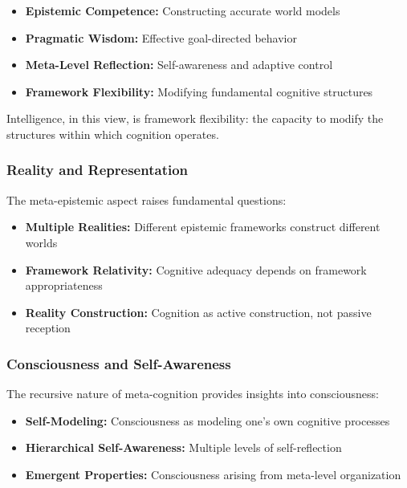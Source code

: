 \documentclass[
]{article}
\providecommand{\tightlist}{%
  \setlength{\itemsep}{0pt}\setlength{\parskip}{0pt}}
\begin{document}
\begin{itemize}
\tightlist
\item
  \textbf{Epistemic Competence:} Constructing accurate world models
\item
  \textbf{Pragmatic Wisdom:} Effective goal-directed behavior
\item
  \textbf{Meta-Level Reflection:} Self-awareness and adaptive control
\item
  \textbf{Framework Flexibility:} Modifying fundamental cognitive
  structures
\end{itemize}

Intelligence, in this view, is framework flexibility: the capacity to
modify the structures within which cognition operates.

\subsubsection{Reality and
Representation}\label{reality-and-representation}

The meta-epistemic aspect raises fundamental questions:

\begin{itemize}
\tightlist
\item
  \textbf{Multiple Realities:} Different epistemic frameworks construct
  different worlds
\item
  \textbf{Framework Relativity:} Cognitive adequacy depends on framework
  appropriateness
\item
  \textbf{Reality Construction:} Cognition as active construction, not
  passive reception
\end{itemize}

\subsubsection{Consciousness and
Self-Awareness}\label{consciousness-and-self-awareness}

The recursive nature of meta-cognition provides insights into
consciousness:

\begin{itemize}
\tightlist
\item
  \textbf{Self-Modeling:} Consciousness as modeling one's own cognitive
  processes
\item
  \textbf{Hierarchical Self-Awareness:} Multiple levels of
  self-reflection
\item
  \textbf{Emergent Properties:} Consciousness arising from meta-level
  organization
\end{itemize}
\end{document}
